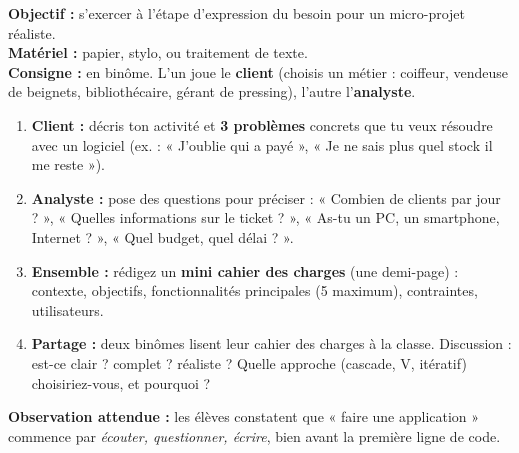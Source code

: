 \documentclass[11pt]{article}
\begin{document}
\begin{experience}
\textbf{Objectif :} s'exercer à l'étape d'expression du besoin pour un micro-projet réaliste.\\
\textbf{Matériel :} papier, stylo, ou traitement de texte.\\
\textbf{Consigne :} en binôme. L'un joue le \textbf{client} (choisis un métier : coiffeur, vendeuse de beignets, bibliothécaire, gérant de pressing), l'autre l'\textbf{analyste}.
\begin{enumerate}
    \item \textbf{Client :} décris ton activité et \textbf{3 problèmes} concrets que tu veux résoudre avec un logiciel (ex. : « J'oublie qui a payé », « Je ne sais plus quel stock il me reste »).
    \item \textbf{Analyste :} pose des questions pour préciser : « Combien de clients par jour ? », « Quelles informations sur le ticket ? », « As-tu un PC, un smartphone, Internet ? », « Quel budget, quel délai ? ».
    \item \textbf{Ensemble :} rédigez un \textbf{mini cahier des charges} (une demi-page) : contexte, objectifs, fonctionnalités principales (5 maximum), contraintes, utilisateurs.
    \item \textbf{Partage :} deux binômes lisent leur cahier des charges à la classe. Discussion : est-ce clair ? complet ? réaliste ? Quelle approche (cascade, V, itératif) choisiriez-vous, et pourquoi ?
\end{enumerate}
\textbf{Observation attendue :} les élèves constatent que « faire une application » commence par \emph{écouter, questionner, écrire}, bien avant la première ligne de code.
\end{experience}
\end{document}
